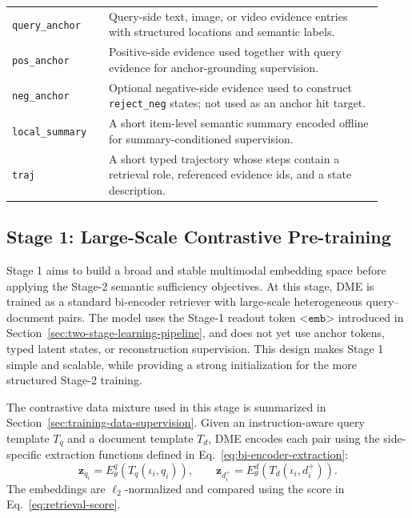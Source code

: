\begin{tcolorbox}[
    colback=blue!5,
    colframe=blue!65!black,
    title={Structured Supervision for Stage 2-A},
    fonttitle=\bfseries,
    boxrule=0.8pt,
    arc=2pt
]
\small
\begin{tabular}{p{0.24\linewidth}p{0.68\linewidth}}
\texttt{query\_anchor} &
Query-side text, image, or video evidence entries with structured locations and semantic labels. \\

\texttt{pos\_anchor} &
Positive-side evidence used together with query evidence for anchor-grounding supervision. \\

\texttt{neg\_anchor} &
Optional negative-side evidence used to construct \texttt{reject\_neg} states; not used as an anchor hit target. \\

\texttt{local\_summary} &
A short item-level semantic summary encoded offline for summary-conditioned supervision. \\

\texttt{traj} &
A short typed trajectory whose steps contain a retrieval role, referenced evidence ids, and a state description. \\
\end{tabular}
\end{tcolorbox}


\subsection{Stage 1: Large-Scale Contrastive Pre-training}
\label{sec:stage1-contrastive-pretraining}

Stage 1 aims to build a broad and stable multimodal embedding space before applying the Stage-2 semantic sufficiency objectives. At this stage, DME is trained as a standard bi-encoder retriever with large-scale heterogeneous query--document pairs. The model uses the Stage-1 readout token $\texttt{<emb>}$ introduced in Section~\ref{sec:two-stage-learning-pipeline}, and does not yet use anchor tokens, typed latent states, or reconstruction supervision. This design makes Stage 1 simple and scalable, while providing a strong initialization for the more structured Stage-2 training.

The contrastive data mixture used in this stage is summarized in Section~\ref{sec:training-data-supervision}.
Given an instruction-aware query template $T_q$ and a document template $T_d$, DME encodes each pair using the side-specific extraction functions defined in Eq.~\eqref{eq:bi-encoder-extraction}:
\begin{equation}
    \mathbf{z}_{q_i}
    =
    E_{\theta}^{q}
    \left(
        T_q(\iota_i,q_i)
    \right),
    \qquad
    \mathbf{z}_{d_i^+}
    =
    E_{\theta}^{d}
    \left(
        T_d(\iota_i,d_i^+)
    \right).
\label{eq:stage1-pair-encoding}
\end{equation}
The embeddings are $\ell_2$-normalized and compared using the score in Eq.~\eqref{eq:retrieval-score}.

